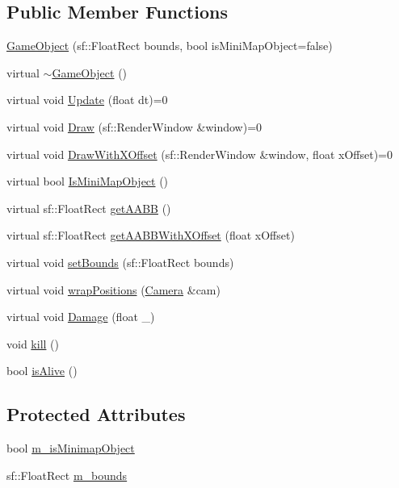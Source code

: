 \subsection*{Public Member Functions}
\begin{DoxyCompactItemize}
\item 
\hyperlink{class_game_object_aede2e0cfea6141c4fe0c8413e364d05a}{Game\+Object} (sf\+::\+Float\+Rect bounds, bool is\+Mini\+Map\+Object=false)
\item 
virtual \hyperlink{class_game_object_a224d4f6d9dd75c8a6f9d022eaf586fd9}{$\sim$\+Game\+Object} ()
\item 
virtual void \hyperlink{class_game_object_a93ed63df640deb516a020530e7f8e045}{Update} (float dt)=0
\item 
virtual void \hyperlink{class_game_object_a0bd45eb831b3d0959eb498cad3e412ce}{Draw} (sf\+::\+Render\+Window \&window)=0
\item 
virtual void \hyperlink{class_game_object_a8a3c07e92775fe00baa9e661fefb224e}{Draw\+With\+X\+Offset} (sf\+::\+Render\+Window \&window, float x\+Offset)=0
\item 
virtual bool \hyperlink{class_game_object_a86859eb19fa3f64529c83542ffa565e6}{Is\+Mini\+Map\+Object} ()
\item 
virtual sf\+::\+Float\+Rect \hyperlink{class_game_object_a4f5a473c0deffd85dc208d552cdb9018}{get\+A\+A\+BB} ()
\item 
virtual sf\+::\+Float\+Rect \hyperlink{class_game_object_a9d66c8590666d763d5fa0d380f534e3a}{get\+A\+A\+B\+B\+With\+X\+Offset} (float x\+Offset)
\item 
virtual void \hyperlink{class_game_object_adf9c98e9a2d3637bf57065d5a407e697}{set\+Bounds} (sf\+::\+Float\+Rect bounds)
\item 
virtual void \hyperlink{class_game_object_a53b129d55688652e25e6515d80e669ca}{wrap\+Positions} (\hyperlink{class_camera}{Camera} \&cam)
\item 
virtual void \hyperlink{class_game_object_a1c5da37ca4c3e7d2bfa8970eb9b5202d}{Damage} (float \+\_\+)
\item 
void \hyperlink{class_game_object_af54107b086de78b1fc6190088bdfb468}{kill} ()
\item 
bool \hyperlink{class_game_object_a2494b14b0e42549791b67d271503a0bc}{is\+Alive} ()
\end{DoxyCompactItemize}
\subsection*{Protected Attributes}
\begin{DoxyCompactItemize}
\item 
bool \hyperlink{class_game_object_a0ebb879c289d02bd83519e6c60dca27b}{m\+\_\+is\+Minimap\+Object}
\item 
sf\+::\+Float\+Rect \hyperlink{class_game_object_a6cb7e612660cf9ef98b573dd50407e20}{m\+\_\+bounds}
\end{DoxyCompactItemize}


